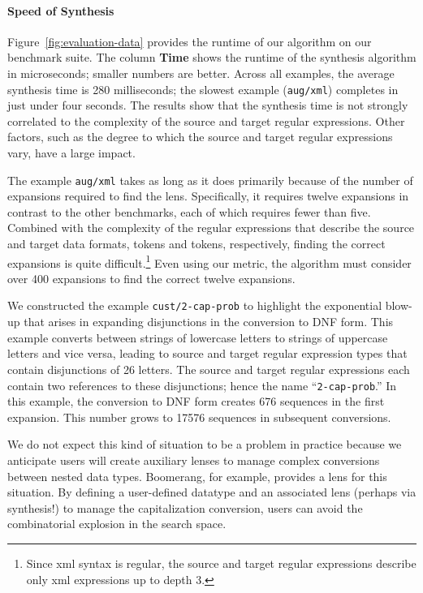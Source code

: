 \documentclass[numbers,10pt,preprint\ifanon ,nocopyrightspace\fi]{sigplanconf}
\begin{document}
\paragraph*{Speed of Synthesis}
%
Figure~\ref{fig:evaluation-data} provides the runtime of our algorithm on our
benchmark suite. The column \textbf{Time} shows the runtime of the
synthesis algorithm in microseconds; smaller numbers are better.
Across all examples, the average synthesis time is 280 milliseconds;
the slowest example (\texttt{aug/xml}) completes in just under four 
seconds. 
The results show that the synthesis time is not strongly correlated
to the complexity of the source and target regular expressions.  Other
factors, such as the degree to which the source and target regular
expressions vary, have a large impact.

The example \texttt{aug/xml} takes as long as it does primarily
because of the number of expansions required to find the lens.
Specifically, it requires twelve expansions
in contrast to the other
benchmarks, each of which requires fewer than five.  Combined with the
complexity of the regular expressions that describe the source and
target data formats,  tokens and  tokens,
respectively, finding the correct expansions is quite
difficult.\footnote{Since xml syntax is regular,
  the source and target regular expressions describe only xml
  expressions up to depth 3.}
Even using our metric, the algorithm must consider over 400 expansions
to find the correct twelve expansions.

We constructed the example \texttt{cust/2-cap-prob} to
highlight the exponential blow-up that arises in expanding
disjunctions in the conversion to DNF form.  This example converts
between strings of lowercase letters to strings of uppercase letters
and vice versa, leading to source and target regular expression types
that contain disjunctions of 26 letters.  The source and target
regular expressions each contain two references to these disjunctions;
hence the name ``\texttt{2-cap-prob}.''  In this example, the conversion to DNF
form creates 676 sequences in the first expansion.  This number grows
to 17576 sequences in subsequent conversions.

We do not expect this kind of situation to be a problem in practice
because we anticipate users will create auxiliary lenses to manage
complex conversions between nested data types.  Boomerang, for
example, provides a  lens for this situation.  By
defining a user-defined datatype and an associated lens (perhaps via
synthesis!) to manage the capitalization conversion, users can avoid
the combinatorial explosion in the search space.
\end{document}
